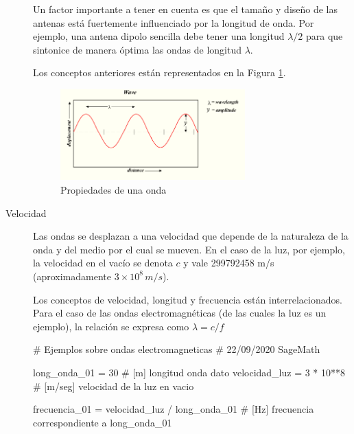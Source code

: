 \begin{description}



Un factor importante a tener en cuenta es que el tama\~no y dise\~no de las antenas est\'a fuertemente influenciado por la longitud de onda. Por ejemplo, una antena dipolo sencilla debe tener una longitud $\lambda/2$ para que sintonice de manera \'optima las ondas de longitud $\lambda$.

Los conceptos anteriores est\'an representados en la Figura \ref{fig:propiedades-onda}.

\begin{figure}[!h]
  \centering
 \includegraphics[width=0.7\textwidth]{06.radionavegacion/Imagenes/06.01.adf/propiedades-onda.png}  
  \caption{Propiedades de una onda \protect\cite{wikipedia_esp}}
  \label{fig:propiedades-onda}
\end{figure}


\item [Velocidad] Las ondas se desplazan a una velocidad que depende de la naturaleza de la onda y del medio por el cual se mueven. En el caso de la luz, por ejemplo, la velocidad en el vac\'io se denota $c$ y vale 299792458 m/s (aproximadamente $3 \times 10^8 \, m/s$).

Los conceptos de velocidad, longitud y frecuencia est\'an interrelacionados. Para el caso de las ondas electromagn\'eticas (de las cuales la luz es un ejemplo), la relaci\'on se expresa como $ \lambda = c / f $

\begin{tcolorbox}
  \begin{sagesilent}
# Ejemplos sobre ondas electromagneticas
# 22/09/2020  SageMath 


long_onda_01 = 30           # [m] longitud onda dato
velocidad_luz = 3 * 10**8   # [m/seg] velocidad de la luz en vacio

frecuencia_01 = velocidad_luz / long_onda_01  # [Hz] frecuencia correspondiente a long_onda_01


\end{sagesilent}
\end{tcolorbox}
\end{description}
